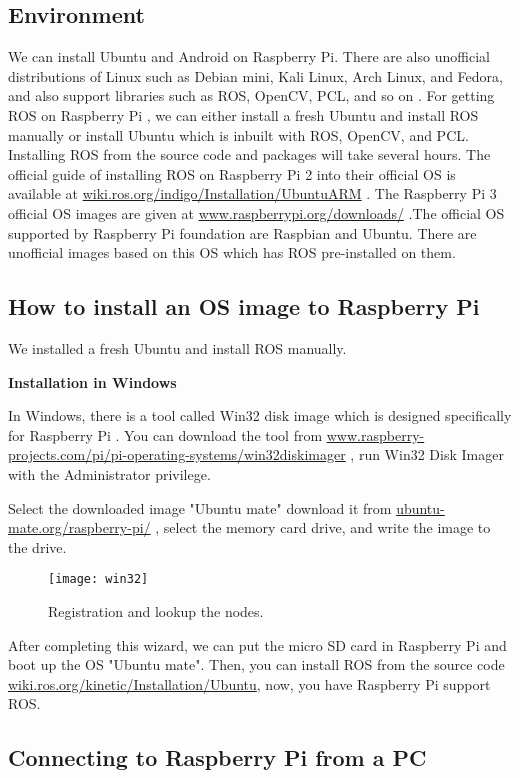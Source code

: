 \subsection{Environment}
We can install Ubuntu and Android on Raspberry Pi. There are also unofficial distributions of Linux such as Debian mini, Kali Linux, Arch Linux, and Fedora, and also support libraries such as ROS, OpenCV, PCL, and so on .
For getting ROS on Raspberry Pi , we can either install a fresh Ubuntu and install ROS manually or install Ubuntu which is inbuilt with ROS, OpenCV, and PCL.
Installing ROS from the source code and packages will take several hours. 
The official guide of installing ROS on Raspberry Pi 2 into their official OS is available at \url{wiki.ros.org/indigo/Installation/UbuntuARM} .
The Raspberry Pi 3 official OS images are given at \url{www.raspberrypi.org/downloads/} .The official OS supported by Raspberry Pi foundation are Raspbian and Ubuntu. There are unofficial images based on this OS which has ROS pre-installed on them.

\subsection{How to install an OS image to Raspberry Pi}

We installed a fresh Ubuntu and install ROS manually. 

\textbf{Installation in Windows}

In Windows, there is a tool called Win32 disk image which is designed specifically for Raspberry Pi . You can download the tool from \url{www.raspberry-projects.com/pi/pi-operating-systems/win32diskimager} , run Win32 Disk Imager with the Administrator privilege.

Select the downloaded image  "Ubuntu mate" download it from \url{ubuntu-mate.org/raspberry-pi/} , select the memory card drive, and write the image to the drive.

\begin{figure}[h]		
	\centering
	\texttt{[image: win32]}
	\caption{Registration and lookup the nodes.}
	\label{Fig:Win32}
\end{figure}

After completing this wizard, we can put the micro SD card in Raspberry Pi and boot up the OS "Ubuntu mate". Then, you can install ROS from the source code \url{wiki.ros.org/kinetic/Installation/Ubuntu}, now, you have Raspberry Pi support ROS.

\subsection{Connecting to Raspberry Pi from a PC}


